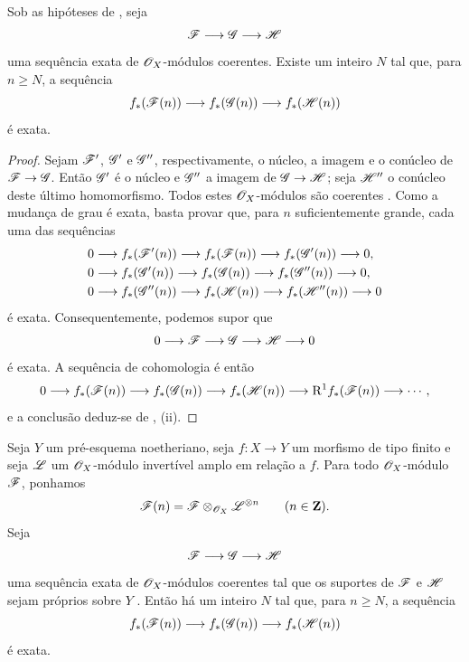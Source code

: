 \begin{corollary}[2.2.3]
\label{III.2.2.3}
Sob as hipóteses de , seja
\[
  \mathscr{F}\longrightarrow\mathscr{G}\longrightarrow\mathscr{H}
\]
uma sequência exata de $\mathscr{O}_X$-módulos coerentes.
Existe um inteiro $N$ tal que, para $n\geq N$, a sequência
\[
  f_*(\mathscr{F}(n))
  \longrightarrow f_*(\mathscr{G}(n))
  \longrightarrow f_*(\mathscr{H}(n))
\]
é exata.
\end{corollary}

\begin{proof}
Sejam $\mathscr{F}'$, $\mathscr{G}'$ e $\mathscr{G}''$, respectivamente, o núcleo, a imagem e o conúcleo de $\sh{F}\to\sh{G}$.
Então $\mathscr{G}'$ é o núcleo e $\mathscr{G}''$ a imagem de $\sh{G}\to\sh{H}$; seja $\mathscr{H}''$ o conúcleo deste último homomorfismo.
Todos estes $\mathscr{O}_X$-módulos são coerentes .
Como a mudança de grau é exata, basta provar que, para $n$ suficientemente grande, cada uma das sequências
\begin{align*}
  0&\longrightarrow f_*(\mathscr{F}'(n))
    \longrightarrow f_*(\mathscr{F}(n))
    \longrightarrow f_*(\mathscr{G}'(n))
    \longrightarrow0,\\
  0&\longrightarrow f_*(\mathscr{G}'(n))
    \longrightarrow f_*(\mathscr{G}(n))
    \longrightarrow f_*(\mathscr{G}''(n))
    \longrightarrow0,\\
  0&\longrightarrow f_*(\mathscr{G}''(n))
    \longrightarrow f_*(\mathscr{H}(n))
    \longrightarrow f_*(\mathscr{H}''(n))
    \longrightarrow0
\end{align*}
é exata.
Consequentemente, podemos supor que
\[
  0\longrightarrow\mathscr{F}\longrightarrow\mathscr{G}
   \longrightarrow\mathscr{H}\longrightarrow0
\]
é exata.
A sequência de cohomologia é então
\[
  0\longrightarrow f_*(\mathscr{F}(n))
  \longrightarrow f_*(\mathscr{G}(n))
  \longrightarrow f_*(\mathscr{H}(n))
  \longrightarrow \mathrm{R}^1f_*(\mathscr{F}(n))
  \longrightarrow\cdots,
\]
e a conclusão deduz-se de , (ii).
\end{proof}


\begin{corollary}[2.2.4]
\label{III.2.2.4}
Seja $Y$ um pré-esquema noetheriano, seja $f:X\to Y$ um morfismo de tipo finito e seja $\mathscr{L}$ um $\mathscr{O}_X$-módulo invertível amplo em relação a $f$.
Para todo $\mathscr{O}_X$-módulo $\mathscr{F}$, ponhamos
\[
  \mathscr{F}(n)=\mathscr{F}\otimes_{\mathscr{O}_X}\mathscr{L}^{\otimes n}
  \qquad(n\in\mathbf{Z}).
\]
Seja
\[
  \mathscr{F}\longrightarrow\mathscr{G}\longrightarrow\mathscr{H}
\]
uma sequência exata de $\mathscr{O}_X$-módulos coerentes tal que os suportes de $\mathscr{F}$ e $\mathscr{H}$ sejam próprios sobre $Y$ .
Então há um inteiro $N$ tal que, para $n\geq N$, a sequência
\[
  f_*(\mathscr{F}(n))
  \longrightarrow f_*(\mathscr{G}(n))
  \longrightarrow f_*(\mathscr{H}(n))
\]
é exata.
\end{corollary}

